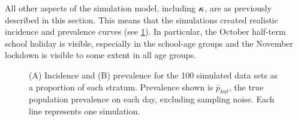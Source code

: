 \documentclass[thesis.tex]{subfiles}
\begin{document}
All other aspects of the simulation model, including $\bm{\kappa}$, are as previously described in this section.
This means that the simulations created realistic incidence and prevalence curves (see \cref{SEIR:fig:sim-data}).
In particular, the October half-term school holiday is visible, especially in the school-age groups and the November lockdown is visible to some extent in all age groups.
\begin{figure}
    \vspace{-3cm}
    \caption[Simulated data]{%
        (A) Incidence and (B) prevalence for the 100 simulated data sets as a proportion of each stratum.
        Prevalence shown is $\bar{p}_{kat}$, the true population prevalence on each day, excluding sampling noise.
        Each line represents one simulation.
    }
    \label{SEIR:fig:sim-data}
\end{figure}

\end{document}
